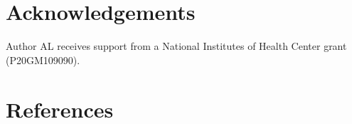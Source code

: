 \documentclass[
  english,
  man]{apa6}
\begin{document}
\hypertarget{acknowledgements}{%
\section{Acknowledgements}\label{acknowledgements}}

Author AL receives support from a National Institutes of Health Center
grant (P20GM109090).

\newpage

\hypertarget{references}{%
\section{References}\label{references}}

\begingroup
\setlength{\parindent}{-0.5in}
\setlength{\leftskip}{0.5in}

\hypertarget{refs}{}
\end{document}
